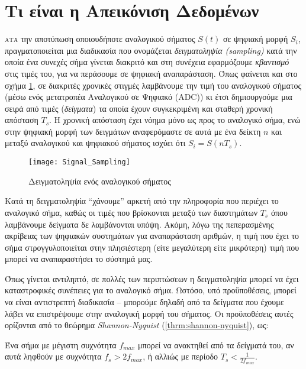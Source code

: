 


\section{Τι είναι η Απεικόνιση Δεδομένων}

\lettrine[findent=2pt]{}{ατά} την αποτύπωση οποιουδήποτε αναλογικού σήματος $S(t)$ σε ψηφιακή μορφή $S_i$, πραγματοποιείται μια διαδικασία που ονομάζεται \emph{δειγματοληψία (sampling)} κατά την οποία ένα συνεχές σήμα γίνεται διακριτό και στη συνέχεια εφαρμόζουμε \emph{κβαντισμό} στις τιμές του, για να περάσουμε σε ψηφιακή αναπαράσταση. Όπως φαίνεται και στο σχήμα \ref{fig:sampling}, σε διακριτές χρονικές στιγμές λαμβάνουμε την τιμή του αναλογικού σήματος (μέσω ενός μετατροπέα Αναλογικού σε Ψηφιακό (ADC)) κι έτσι δημιουργούμε μια σειρά από τιμές (\emph{δείγματα}) τα οποία έχουν συγκεκριμένη και σταθερή χρονική απόσταση $T_s$. Η χρονική απόσταση έχει νόημα μόνο ως προς το αναλογικό σήμα, ενώ στην ψηφιακή μορφή των δειγμάτων αναφερόμαστε σε αυτά με ένα δείκτη $n$ και μεταξύ αναλογικού και ψηφιακού σήματος ισχύει ότι $S_i=S(nT_s)$.
\begin{figure}[h]
  \centering
  \texttt{[image: Signal\_Sampling]}
  \caption{Δειγματοληψία ενός αναλογικού σήματος}
  \label{fig:sampling}
\end{figure}
Κατά τη δειγματοληψία ``χάνουμε'' αρκετή από την πληροφορία που περιέχει το αναλογικό σήμα, καθώς οι τιμές που βρίσκονται μεταξύ των διαστημάτων $T_s$ όπου λαμβάνουμε δείγματα δε λαμβάνονται υπόψη. Ακόμη, λόγω της πεπερασμένης ακρίβειας των ψηφιακών συστημάτων για αναπαράσταση αριθμών, η τιμή που έχει το σήμα στρογγυλοποιείται στην πλησιέστερη (είτε μεγαλύτερη είτε μικρότερη) τιμή που μπορεί να αναπαραστήσει το σύστημά μας.

Όπως γίνεται αντιληπτό, σε πολλές των περιπτώσεων η δειγματοληψία μπορεί να έχει καταστροφικές συνέπειες για το αναλογικό σήμα. Ωστόσο, υπό προϋποθέσεις, μπορεί να είναι αντιστρεπτή διαδικασία -- μπορούμε δηλαδή από τα δείγματα που έχουμε λάβει να επιστρέψουμε στην αναλογική μορφή του σήματος. Οι προϋποθέσεις αυτές ορίζονται από το θεώρημα \emph{Shannon-Nyquist} (\ref{thrm:shannon-nyquist}), ως:
\\
\begin{theorem}
	\label{thrm:shannon-nyquist}
	Ένα σήμα με μέγιστη συχνότητα $f_{max}$ μπορεί να ανακτηθεί από τα δείγματά του, αν αυτά ληφθούν με συχνότητα $f_s>2f_{max}$, ή αλλιώς με περίοδο $T_s<\frac{1}{2f_{max}}$. \cite{proakis_sampling}
\end{theorem}